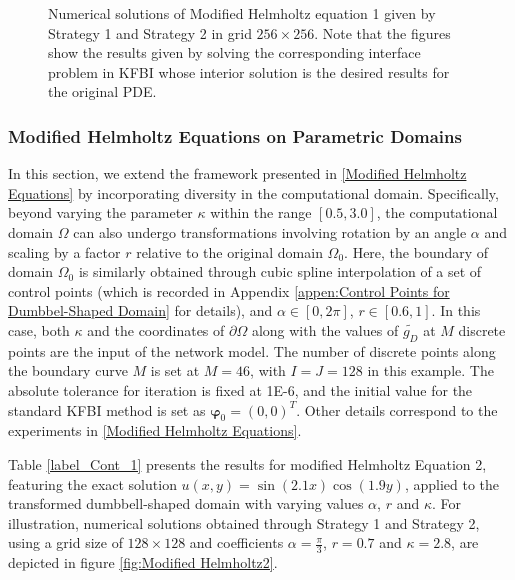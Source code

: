 \documentclass{article}
\begin{document}
\begin{figure}[htb]
\begin{minipage}[t]{0.48\textwidth}
\end{minipage}
\caption{Numerical solutions of Modified Helmholtz equation 1 given by Strategy 1 and Strategy 2 in grid $256 \times 256$. Note that the figures show the results given by solving the corresponding interface problem in KFBI whose interior solution is the desired results for the original PDE.}
\label{fig:Modified Helmholtz}
\end{figure}

\subsubsection{Modified Helmholtz Equations on Parametric Domains} \label{Modified Helmholtz Equations on Parametric Domains}
In this section, we extend the framework presented in \ref{Modified Helmholtz Equations} by incorporating diversity in the computational domain. Specifically, beyond varying the parameter $\kappa$ within the range $[0.5, 3.0]$, the computational domain $\Omega$ can also undergo transformations involving rotation by an angle $\alpha$ and scaling by a factor $r$ relative to the original domain $\Omega_0$. Here, the boundary of domain $\Omega_0$ is similarly obtained through cubic spline interpolation of a set of control points (which is recorded in Appendix \ref{appen:Control Points for Dumbbel-Shaped Domain} for details), and $\alpha \in [0, 2 \pi]$, $r \in [0.6, 1]$. In this case, both $\kappa$ and the coordinates of $\partial \Omega$ along with the values of $\widetilde{g_D}$ at $M$ 
discrete points are the input of the network model. The number of discrete points along the boundary curve $M$ is set at $M = 46$, with $I = J = 128$ in this example. The absolute tolerance for iteration is fixed at 1E-6, and the initial value for the standard KFBI method is set as $\mathbf{\varphi}_0 = (0, 0)^T$. Other details correspond to the experiments in \ref{Modified Helmholtz Equations}.

Table \ref{label_Cont_1} presents the results for modified Helmholtz Equation 2, featuring the exact solution \(u(x, y) = \sin(2.1 x) \cos(1.9 y) \), applied to the transformed dumbbell-shaped domain with varying values $\alpha$, $r$ and $\kappa$. For illustration, numerical solutions obtained through Strategy 1 and Strategy 2, using a grid size of $128 \times 128$ and coefficients $\alpha = \frac{\pi}{3}$, $r = 0.7$ and $\kappa = 2.8$, are depicted in figure \ref{fig:Modified Helmholtz2}.
\end{document}
